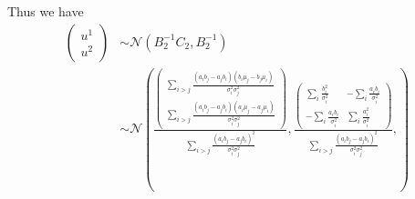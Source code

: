 \documentclass{article}
\begin{document}
Thus we have
\begin{align}
\left( \begin{array}{c} u^1\\u^2 \end{array} \right)
&\sim \mathcal{N}(B_2^{-1}C_2,B_2^{-1})\\
&\sim \mathcal{N}(\frac{\left( \begin{array}{c} \sum_{i>j}\frac{(a_ib_j-a_jb_i)(b_i\mu_j-b_j\mu_i)}{\sigma_i^2\sigma_j^2}\\\sum_{i>j}\frac{(a_ib_j-a_jb_i)(a_i\mu_j-a_j\mu_i)}{\sigma_i^2\sigma_j^2} \end{array} \right)}{\sum_{i>j}\frac{(a_ib_j-a_jb_i)^2}{\sigma_i^2\sigma_j^2}},
\frac{\left( \begin{array}{cc} \sum_i\frac{b_i^2}{\sigma_i^2}&-\sum_i\frac{a_ib_i}{\sigma_i^2}\\-\sum_i\frac{a_ib_i}{\sigma_i^2}&\sum_i\frac{a_i^2}{\sigma_i^2}\end{array} \right)}{\sum_{i>j}\frac{(a_ib_j-a_jb_i)^2}{\sigma_i^2\sigma_j^2}},
)
\end{align}
\end{document}
